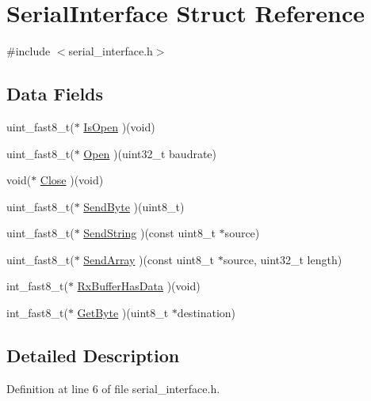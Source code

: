\hypertarget{struct_serial_interface}{}\section{Serial\+Interface Struct Reference}
\label{struct_serial_interface}


{\ttfamily \#include $<$serial\+\_\+interface.\+h$>$}

\subsection*{Data Fields}
\begin{DoxyCompactItemize}
\item 
uint\+\_\+fast8\+\_\+t($\ast$ \hyperlink{struct_serial_interface_a5e72e5c9ff8f55863484f5a31a044a10}{Is\+Open} )(void)
\item 
uint\+\_\+fast8\+\_\+t($\ast$ \hyperlink{struct_serial_interface_aafb5a65915da9b72df39987f9c20050d}{Open} )(uint32\+\_\+t baudrate)
\item 
void($\ast$ \hyperlink{struct_serial_interface_afe54572dbd83578a45d1cd4156c0979d}{Close} )(void)
\item 
uint\+\_\+fast8\+\_\+t($\ast$ \hyperlink{struct_serial_interface_a49276961133a48866ca6550472cd2696}{Send\+Byte} )(uint8\+\_\+t)
\item 
uint\+\_\+fast8\+\_\+t($\ast$ \hyperlink{struct_serial_interface_af6bdcb2e604bd52ceba2ffdaffbb4341}{Send\+String} )(const uint8\+\_\+t $\ast$source)
\item 
uint\+\_\+fast8\+\_\+t($\ast$ \hyperlink{struct_serial_interface_a7e615bf5681ba25bcaba8afb1cc33c39}{Send\+Array} )(const uint8\+\_\+t $\ast$source, uint32\+\_\+t length)
\item 
int\+\_\+fast8\+\_\+t($\ast$ \hyperlink{struct_serial_interface_ace39ec2bddbae9971dd0aab419ccd4b7}{Rx\+Buffer\+Has\+Data} )(void)
\item 
int\+\_\+fast8\+\_\+t($\ast$ \hyperlink{struct_serial_interface_ae3fb059727674674e6bc14ce661fff6d}{Get\+Byte} )(uint8\+\_\+t $\ast$destination)
\end{DoxyCompactItemize}


\subsection{Detailed Description}


Definition at line 6 of file serial\+\_\+interface.\+h.



